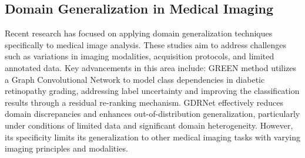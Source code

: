 \subsection{Domain Generalization in Medical Imaging}

Recent research has focused on applying domain generalization techniques specifically to medical image analysis. 
These studies aim to address challenges such as variations in imaging modalities, acquisition protocols, and limited annotated data. 
Key advancements in this area include:
GREEN\cite{liu2020green} method utilizes a Graph Convolutional Network to model class dependencies in diabetic retinopathy grading, addressing label uncertainty and improving the classification results through a residual re-ranking mechanism. 
GDRNet \cite{dgdr2023} effectively reduces domain discrepancies and enhances out-of-distribution generalization, particularly under conditions of limited data and significant domain heterogeneity. However, its specificity limits its generalization to other medical imaging tasks with varying imaging principles and modalities.
